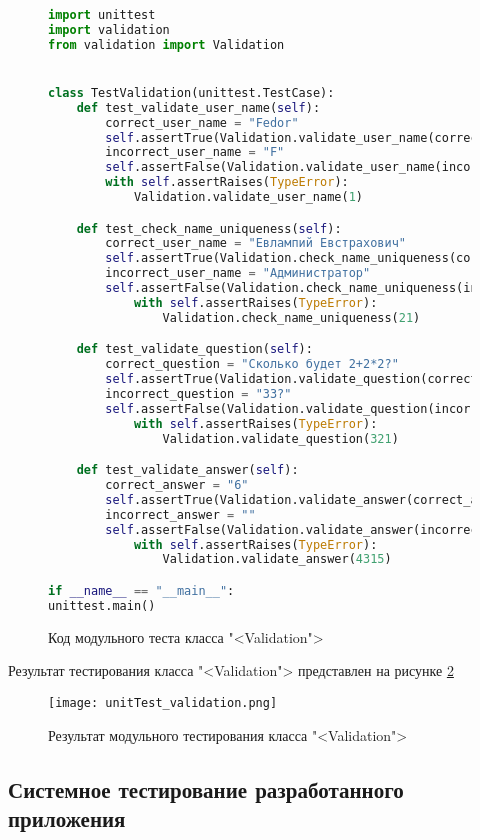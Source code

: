 \begin{figure}[H]
\begin{lstlisting}[language=Python]
import unittest
import validation
from validation import Validation


class TestValidation(unittest.TestCase):
	def test_validate_user_name(self):
		correct_user_name = "Fedor"
		self.assertTrue(Validation.validate_user_name(correct_user_name))
		incorrect_user_name = "F"
		self.assertFalse(Validation.validate_user_name(incorrect_user_name))
		with self.assertRaises(TypeError):
			Validation.validate_user_name(1)

	def test_check_name_uniqueness(self):
		correct_user_name = "Евлампий Евстрахович"
		self.assertTrue(Validation.check_name_uniqueness(correct_user_name))
		incorrect_user_name = "Администратор"
		self.assertFalse(Validation.check_name_uniqueness(incorrect_user_name))
			with self.assertRaises(TypeError):
				Validation.check_name_uniqueness(21)

	def test_validate_question(self):
		correct_question = "Сколько будет 2+2*2?"
		self.assertTrue(Validation.validate_question(correct_question))
		incorrect_question = "33?"
		self.assertFalse(Validation.validate_question(incorrect_question))
			with self.assertRaises(TypeError):
				Validation.validate_question(321)

	def test_validate_answer(self):
		correct_answer = "6"
		self.assertTrue(Validation.validate_answer(correct_answer))
		incorrect_answer = ""
		self.assertFalse(Validation.validate_answer(incorrect_answer))
			with self.assertRaises(TypeError):
				Validation.validate_answer(4315)

if __name__ == "__main__":
unittest.main()
\end{lstlisting}  
\caption{Код модульного теста класса "<Validation">}
\label{unitTestValidation_code:image}
\end{figure}

Результат тестирования класса "<Validation"> представлен на рисунке \ref{unitTest_validation_result:image}

\begin{figure}[ht]
	\centering
	\texttt{[image: unitTest\_validation.png]}
	\caption{Результат модульного тестирования класса "<Validation">}
	\label{unitTest_validation_result:image}
\end{figure}

\subsection{Системное тестирование разработанного приложения}


